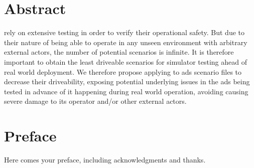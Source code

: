 \chapter*{Abstract}

 rely on extensive testing in order to verify their operational safety. But due to
their nature of being able to operate in any unseen environment with arbitrary external actors,
the number of potential scenarios is infinite. It is therefore important to obtain the least
driveable scenarios for simulator testing ahead of real world deployment. We therefore propose
applying  to \acrlong{ads} scenario files to decrease their driveability, exposing
potential underlying issues in the \acrshort{ads} being tested in advance of it happening during
real world operation, avoiding causing severe damage to its operator and/or other external actors.

\chapter*{Preface}
Here comes your preface, including acknowledgments and thanks.